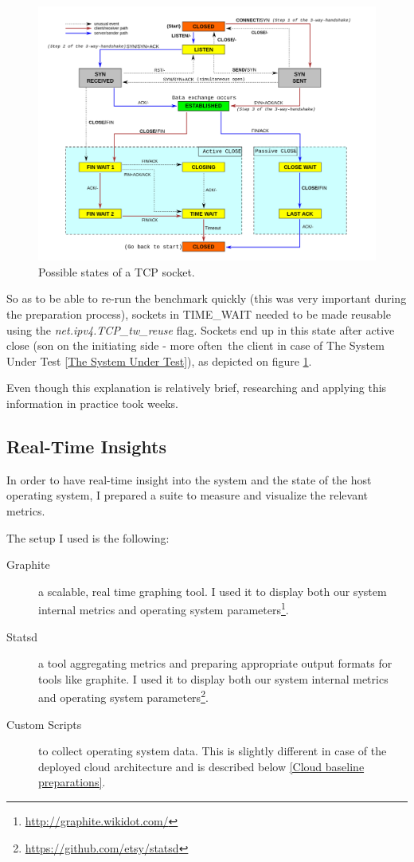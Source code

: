 \documentclass{uvamscse}
\begin{document}
\begin{figure}[H]
\centering
\includegraphics[scale=0.2]{TCPstates}
\caption{Possible states of a TCP socket.}
\label{figure:TCPstates}
\end{figure}

So as to be able to re-run the benchmark quickly (this was very important during the preparation process), sockets in TIME\_WAIT needed to be made reusable using the \textit{net.ipv4.TCP\_tw\_reuse} flag. Sockets end up in this state after active close (son on the initiating side - more often the client in case of The System Under Test \ref{The System Under Test}), as depicted on figure \ref{figure:TCPstates}.

Even though this explanation is relatively brief, researching and applying this information in practice took weeks.

\subsection{Real-Time Insights}

In order to have real-time insight into the system and the state of the host operating system, I prepared a suite to measure and visualize the relevant metrics.

The setup I used is the following:
\begin{description}
  \item[Graphite] a scalable, real time graphing tool. I used it to display both our system internal metrics and operating system parameters\footnote{\url{http://graphite.wikidot.com/}}.
  \item[Statsd] a tool aggregating metrics and preparing appropriate output formats for tools like graphite. I used it to display both our system internal metrics and operating system parameters\footnote{\url{https://github.com/etsy/statsd}}.
  \item[Custom Scripts] to collect operating system data. This is slightly different in case of the deployed cloud architecture and is described below \ref{Cloud baseline preparations}.
\end{description}
\end{document}
